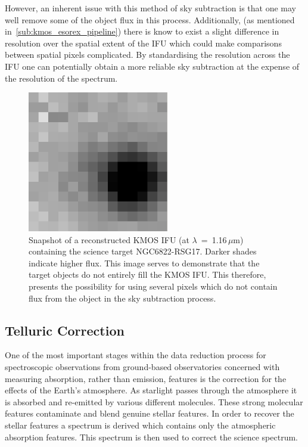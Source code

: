 However, an inherent issue with this method of sky subtraction is that one may well remove some of the object flux in this process.
Additionally, (as mentioned in~\ref{sub:kmos_esorex_pipeline}) there is know to exist a slight difference in resolution over the spatial extent of the IFU which could make comparisons between spatial pixels complicated.
By standardising the resolution across the IFU one can potentially obtain a more reliable sky subtraction at the expense of the resolution of the spectrum.


\begin{figure}
 \centering
\includegraphics[width=0.55\textwidth]{ngc6822/N6822_RSG17-snapshot}
 \caption[IFU Snapshot]{
          Snapshot of a reconstructed KMOS IFU (at $\lambda$~=~1.16\,$\mu$m) containing the science target NGC6822-RSG17.
          Darker shades indicate higher flux.
          This image serves to demonstrate that the target objects do not entirely fill the KMOS IFU.
          This therefore, presents the possibility for using several pixels which do not contain flux from the object in the sky subtraction process.
          }
 \label{fig:IFU_snapshot}
\end{figure}


\subsection{Telluric Correction} %
\label{sub:telluric_correction}

One of the most important stages within the data reduction process for spectroscopic observations from ground-based observatories concerned with measuring absorption, rather than emission, features is the correction for the effects of the Earth's atmosphere.
As starlight passes through the atmosphere it is absorbed and re-emitted by various different molecules.
These strong molecular features contaminate and blend genuine stellar features.
In order to recover the stellar features a spectrum is derived which contains only the atmospheric absorption features.
This spectrum is then used to correct the science spectrum.

